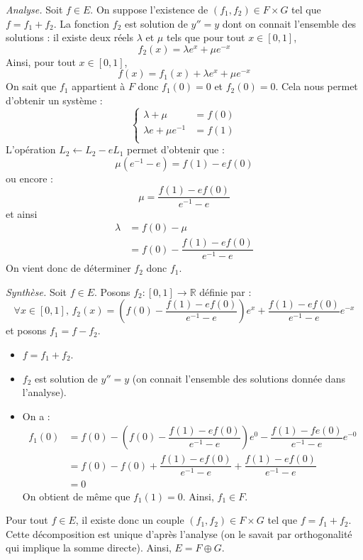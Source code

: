 \documentclass[a4paper,10pt]{report}
\begin{document}
 \medskip
 
 \noindent \textit{Analyse.} Soit $f \in E$. On suppose l'existence de $(f_1,f_2) \in F \times G$ tel que $f=f_1+f_2$. La fonction $f_2$ est solution de $y''=y$ dont on connait l'ensemble des solutions : il existe deux réels $\lambda$ et $\mu$ tels que pour tout $x \in [0,1]$,
 $$ f_2(x) = \lambda e^x + \mu e^{-x}$$
 Ainsi, pour tout $x \in [0,1]$,
 $$ f(x)= f_1(x) + \lambda e^x + \mu e^{-x}$$
 On sait que $f_1$ appartient à $F$ donc $f_1(0)=0$ et $f_2(0) =0$. Cela nous permet d'obtenir un système :
 $$ \left\lbrace \begin{array}{rl}
 \lambda + \mu & = f(0) \\
 \lambda e+ \mu e^{-1} & = f(1) \\
 \end{array}\right.$$
 L'opération $L_2 \leftarrow L_2- e L_1$ permet d'obtenir que :
 $$ \mu (e^{-1}-e) = f(1)-e f(0)$$
 ou encore :
 $$ \mu = \dfrac{f(1)-e f(0)}{e^{-1}-e}$$
 et ainsi
 \begin{align*}
 \lambda & = f(0)- \mu \\
 & = f(0) - \dfrac{f(1)-ef(0)}{e^{-1}-e} 
 \end{align*}
 On vient donc de déterminer $f_2$ donc $f_1$.
 \medskip
 
 \noindent \textit{Synthèse.} Soit $f \in E$. Posons $f_2 : [0,1] \rightarrow \mathbb{R}$ définie par :
 $$ \forall x \in [0,1], \, f_2(x)= \left(f(0) - \dfrac{f(1)-ef(0)}{e^{-1}-e} \right) e^x + \dfrac{f(1)-ef(0)}{e^{-1}-e} e^{-x}$$
 et posons $f_1 = f-f_2$. 
 \begin{itemize}
 \item $f=f_1+f_2$.
 \item $f_2$ est solution de $y''=y$ (on connait l'ensemble des solutions donnée dans l'analyse).
 \item On a :
 \begin{align*}
 f_1(0) & = f(0) - \left(f(0) - \dfrac{f(1)-ef(0)}{e^{-1}-e} \right) e^0 - \dfrac{f(1)-fe(0)}{e^{-1}-e} e^{-0} \\
 & = f(0) -f(0) + \dfrac{f(1)-ef(0)}{e^{-1}-e} + \dfrac{f(1)-ef(0)}{e^{-1}-e} \\
 & = 0 
 \end{align*}
 On obtient de même que $f_1(1)=0$. Ainsi, $f_1 \in F$.
 \end{itemize}
 Pour tout $f \in E$, il existe donc un couple $(f_1,f_2) \in F \times G$ tel que $f=f_1+f_2$. Cette décomposition est unique d'après l'analyse (on le savait par orthogonalité qui implique la somme directe). Ainsi, $E= F \oplus G$.
 
\end{document}

